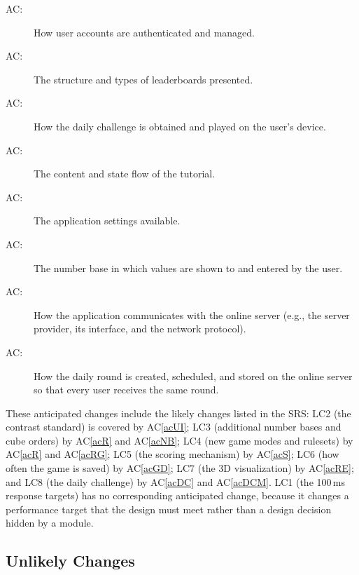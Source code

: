 \documentclass[12pt, titlepage]{article}
\newcounter{acnum}
\newcommand{\actheacnum}{AC\theacnum}
\newcommand{\acref}[1]{AC\ref{#1}}
\begin{document}
\begin{description}
\item [ \actheacnum \label{acAA}:] How user accounts are authenticated and managed.
\item [ \actheacnum \label{acL}:] The structure and types of leaderboards presented.
\item [ \actheacnum \label{acDC}:] How the daily challenge is obtained and played on the user's device.
\item [ \actheacnum \label{acT}:] The content and state flow of the tutorial.
\item [ \actheacnum \label{acSE}:] The application settings available.
\item [ \actheacnum \label{acNB}:] The number base in which values are shown to and entered by the user.
\item [ \actheacnum \label{acSCM}:] How the application communicates with the online server (e.g., the server provider, its interface, and the network protocol).
\item [ \actheacnum \label{acDCM}:] How the daily round is created, scheduled, and stored on the online server so that every user receives the same round.
\end{description}

These anticipated changes include the likely changes listed in the SRS: LC2
(the contrast standard) is covered by \acref{acUI}; LC3 (additional number
bases and cube orders) by \acref{acR} and \acref{acNB}; LC4 (new game modes and
rulesets) by \acref{acR} and \acref{acRG}; LC5 (the scoring mechanism) by
\acref{acS}; LC6 (how often the game is saved) by \acref{acGD}; LC7 (the 3D
visualization) by \acref{acRE}; and LC8 (the daily challenge) by \acref{acDC} and \acref{acDCM}.
LC1 (the 100\,ms response targets) has no corresponding anticipated change,
because it changes a performance target that the design must meet rather than
a design decision hidden by a module.


\subsection{Unlikely Changes} \label{SecUchange}
\end{document}
